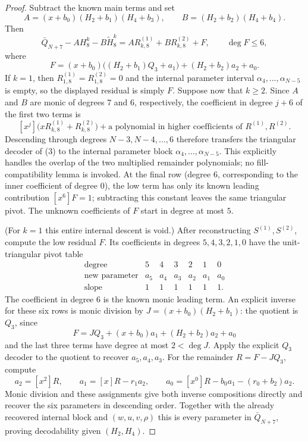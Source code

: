 \begin{proof}
    Subtract the known main terms and set
    \[
      A=(x+b_0)(H_2+b_1)(H_4+b_3),\qquad
      B=(H_2+b_2)(H_4+b_4).
    \]
    Then
    \[
      \bar Q_{N+7}-AH_8^k-B\widetilde H_8^k
       =AR^{(1)}_{k,8}+BR^{(2)}_{k,8}+F,\qquad \deg F\le6,
    \]
    where
    \[
      F=(x+b_0)\bigl((H_2+b_1)Q_3+a_1\bigr)+(H_2+b_2)a_2+a_0.
    \]
    If $k=1$, then $R^{(1)}_{1,8}=R^{(2)}_{1,8}=0$ and the internal parameter
    interval $\alpha_4,\ldots,\alpha_{N-5}$ is empty, so the displayed
    residual is simply $F$.  Suppose now that $k\ge2$.  Since $A$ and $B$
    are monic of degrees $7$ and $6$, respectively, the
    coefficient in degree $j+6$ of the first two terms is
    \[
      [x^j]\bigl(xR^{(1)}_{k,8}+R^{(2)}_{k,8}\bigr)
      +\text{a polynomial in higher coefficients of }R^{(1)},R^{(2)}.
    \]
    Descending through degrees $N-3,N-4,\ldots,6$ therefore transfers the
    triangular decoder of (3) to the internal parameter block
    $\alpha_4,\ldots,\alpha_{N-5}$.  This explicitly handles the overlap of
    the two multiplied remainder polynomials; no fill-compatibility lemma is
    invoked.  At the final row (degree $6$, corresponding to the inner
    coefficient of degree $0$), the low term has only its known leading
    contribution $[x^6]F=1$; subtracting this constant leaves the same
    triangular pivot.  The unknown coefficients of $F$ start in degree at
    most $5$.

    (For $k=1$ this entire internal descent is void.)  After reconstructing
    $S^{(1)},S^{(2)}$, compute the low residual $F$.
    Its coefficients in degrees $5,4,3,2,1,0$ have the unit-triangular pivot
    table
    \[
      \begin{array}{c|cccccc}
        \text{degree}&5&4&3&2&1&0\\ \hline
        \text{new parameter}&a_5&a_4&a_3&a_2&a_1&a_0\\
        \text{slope}&1&1&1&1&1&1.
      \end{array}
    \]
    The coefficient in degree $6$ is the known monic leading term.  An
    explicit inverse for these six rows is monic division by
    $J=(x+b_0)(H_2+b_1)$: the quotient is $Q_3$, since
    \[
      F=JQ_3+(x+b_0)a_1+(H_2+b_2)a_2+a_0
    \]
    and the last three terms have degree at most $2<\deg J$.
    Apply the explicit $Q_3$ decoder to the quotient to recover
    $a_5,a_4,a_3$.  For the remainder $R=F-JQ_3$, compute
    \[
      a_2=[x^2]R,\qquad a_1=[x]R-r_1a_2,\qquad
      a_0=[x^0]R-b_0a_1-(r_0+b_2)a_2.
    \]
    Monic division and these assignments give both inverse compositions
    directly and recover the six parameters in descending order.
    Together with the already
    recovered internal block and $(w,u,v,\rho)$ this is every parameter in
    $\bar Q_{N+7}$, proving decodability given $(H_2,H_4)$.
\end{proof}

